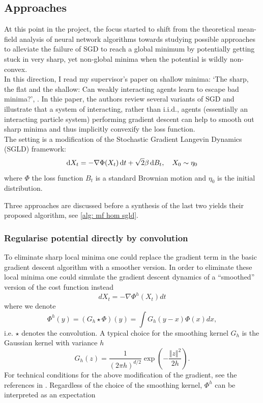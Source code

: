 \documentclass{article}
\begin{document}
\subsection{Approaches}

At this point in the project, the focus started to shift from the theoretical mean-field analysis of neural network algorithms towards studying possible approaches to alleviate the failure of SGD to reach a global minimum by potentially getting stuck in very sharp, yet non-global minima when the potential is wildly non-convex.\\ 

In this direction, I read my supervisor's paper on shallow minima: ‘The sharp, the flat and the shallow: Can weakly interacting agents learn to escape bad minima?’, \cite{kantas2019sharpflatshallowweakl}. In thie paper, the authors review several variants of SGD and illustrate that a system of interacting, rather than i.i.d., agents (essentially an interacting particle system) performing gradient descent can help to smooth out sharp minima and thus implicitly convexify
the loss function.\\ 

The setting is a modification of the Stochastic Gradient Langevin Dynamics (SGLD) framework:
\begin{equation}\label{eq: SGLD}
	\operatorname{d}\! X_{t} = -\nabla \Phi(X_{t})\operatorname{d}\! t + \sqrt{2}\beta \operatorname{d}\!  B_{t}, \quad X_{0}\sim \eta_{0}
\end{equation}
where $ \Phi$ the loss function $ B_{t}$ is a standard Brownian motion and $ \eta_{0}$ is the initial distribution.

Three approaches are discussed before a synthesis of the last two yields their proposed algorithm, see \ref{alg: mf hom sgld}.



\subsubsection{Regularise potential directly by convolution}\label{sec:direct smoothing}

To eliminate sharp local minima one could replace the gradient term
in the basic gradient descent algorithm with a smoother version. In order to
eliminate these local minima one could simulate the gradient descent
dynamics of a ``smoothed'' version of the cost function instead
\begin{equation}
dX_{t}=-\nabla\Phi^{h}(X_{t})dt\label{eq:ode_h}
\end{equation}
where we denote 
\begin{equation}
\Phi^{h}\left(y\right)=(G_{h}\star\Phi)(y)=\int G_{h}(y-x)\Phi(x)dx,\label{eq:integrate phi}
\end{equation}
i.e. $\star$ denotes the convolution. A typical choice for the smoothing
kernel $G_{h}$ is the Gaussian kernel with variance $h$ 
\[
G_{h}(z)=\frac{1}{\left(2\pi h\right)^{d/2}}\exp\left(-\frac{\left\Vert z\right\Vert ^{2}}{2h}\right).
\]
For technical conditions for the above modification of the gradient, see the references in \cite{kantas2019sharpflatshallowweakly}. Regardless
of the choice of the smoothing kernel, $\Phi^{h}$ can be interpreted
as an expectation 
\end{document}
